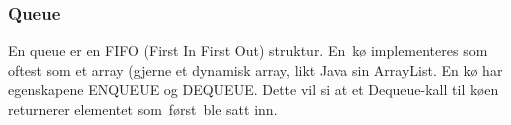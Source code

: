 \documentclass[12pt]{report}
\begin{document}

\subsubsection*{Queue}
\setlength{\parskip}{0.0pt}
En queue er en FIFO (First In First Out) struktur. En\ kø implementeres som oftest som et array (gjerne et dynamisk array, likt Java sin ArrayList. En kø har egenskapene ENQUEUE og DEQUEUE.  Dette vil si at et Dequeue-kall til køen returnerer elementet som først ble satt inn.\par


\vspace{\baselineskip}
\setlength{\parskip}{10.56pt}

\vspace{\baselineskip}
\end{document}
